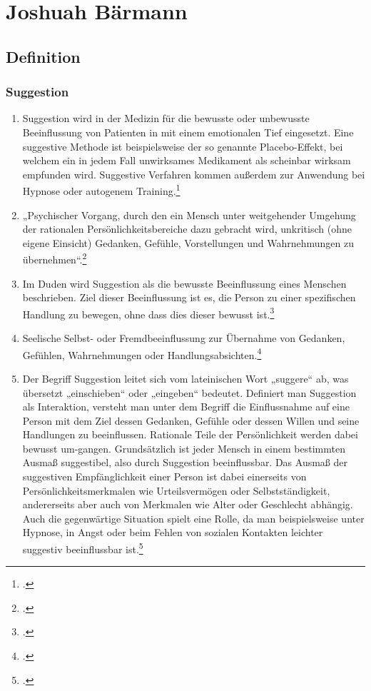 \chapter{Joshuah Bärmann}
\label{sec:Joshuah_Baermann}

\section{Definition}

\subsection{Suggestion}
\begin{enumerate}
	\item Suggestion wird in der Medizin für die bewusste oder unbewusste Beeinflussung von Patienten
in mit einem emotionalen Tief eingesetzt. Eine suggestive Methode ist beispielsweise der so genannte
Placebo-Effekt, bei welchem ein in jedem Fall unwirksames Medikament als scheinbar wirksam empfunden
wird. Suggestive Verfahren kommen außerdem zur Anwendung bei Hypnose oder autogenem
Training.\footcite[145]{Frank_Neurologie_und_Psychiatrie}

	\item „Psychischer Vorgang, durch den ein Mensch unter weitgehender Umgehung der rationalen
Persönlichkeitsbereiche dazu gebracht wird, unkritisch (ohne eigene Einsicht) Gedanken, Gefühle,
Vorstellungen und Wahrnehmungen zu übernehmen“.\footcite[514]{Peters_Woerterbuch_der_Psychiatrie}

	\item Im Duden wird Suggestion als die bewusste Beeinflussung eines Menschen beschrieben. Ziel
dieser Beeinflussung ist es, die Person zu einer spezifischen Handlung zu bewegen, ohne dass dies
dieser bewusst ist.\footcite[782]{Duden:Fremdwoerterbuch}

	\item Seelische Selbst- oder Fremdbeeinflussung zur Übernahme von Gedanken, Gefühlen,
Wahrnehmungen oder
Handlungsabsichten.\footcite[217]{Enzyklopaedie_elektrophysiologischer_Untersuchungen}

	\item Der Begriff Suggestion leitet sich vom lateinischen Wort „suggere“ ab, was übersetzt
„einschieben“ oder „eingeben“ bedeutet. Definiert man Suggestion als Interaktion, versteht man unter
dem Begriff die Einflussnahme auf eine Person mit dem Ziel dessen Gedanken, Gefühle oder dessen
Willen und seine Handlungen zu beeinflussen. Rationale Teile der Persönlichkeit werden dabei bewusst
um-gangen. Grundsätzlich ist jeder Mensch in einem bestimmten Ausmaß suggestibel, also durch
Suggestion beeinflussbar. Das Ausmaß der suggestiven Empfänglichkeit einer Person ist dabei
einerseits von Persönlichkeitsmerkmalen wie Urteilsvermögen oder Selbstständigkeit, andererseits aber
auch von Merkmalen wie Alter oder Geschlecht abhängig. Auch die gegenwärtige Situation spielt eine
Rolle, da man beispielsweise unter Hypnose, in Angst oder beim Fehlen von sozialen Kontakten leichter
suggestiv beeinflussbar ist.\footcite[848]{Psychologisches_Woerterbuch}
\end{enumerate}

